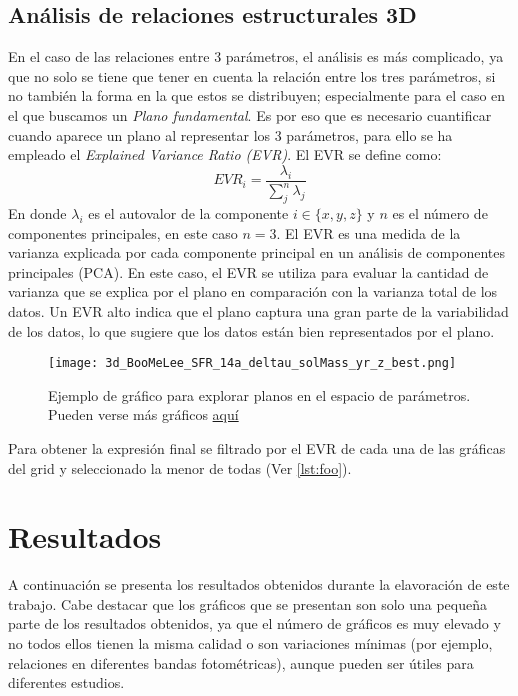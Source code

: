 \documentclass[11pt, a4paper]{article} %
\begin{document}
\subsection{Análisis de relaciones estructurales 3D}

En el caso de las relaciones entre 3 parámetros, el análisis es más complicado, ya que no solo se tiene que tener en cuenta la relación entre los tres parámetros, si no también la forma en la que estos se distribuyen; especialmente para el caso en el que buscamos un \textit{Plano fundamental}. 
Es por eso que es necesario cuantificar cuando aparece un plano al representar los 3 parámetros, para ello se ha empleado el \textit{Explained Variance Ratio (EVR)}. El EVR se define como:
\begin{equation}
    EVR_i=\frac{\lambda_i}{\sum_j^n\lambda_j}
\end{equation}
En donde $\lambda_i$ es el autovalor de la componente $i\in\{x,y,z\}$ y $n$ es el número de componentes principales, en este caso $n=3$.
El EVR es una medida de la varianza explicada por cada componente principal en un análisis de componentes principales (PCA). 
En este caso, el EVR se utiliza para evaluar la cantidad de varianza que se explica por el plano en comparación con la varianza total de los datos. Un EVR alto indica que el plano captura una gran parte de la variabilidad de los datos, lo que sugiere que los datos están bien representados por el plano.

\begin{figure}[H]
    \centering
    \texttt{[image: 3d\_BooMeLee\_SFR\_14a\_deltau\_solMass\_yr\_z\_best.png]}
    \caption{Ejemplo de gráfico para explorar planos en el espacio de parámetros. Pueden verse más gráficos \href{https://github.com/PhyAMR/TFG/tree/main/MSFR}{aquí}}
    \label{fig:3dexample}
\end{figure}

Para obtener la expresión final se filtrado por el EVR de cada una de las gráficas del grid y seleccionado la menor de todas (Ver \ref{lst:foo}).



\section{Resultados}
A continuación se presenta los resultados obtenidos durante la elavoración de este trabajo. Cabe destacar que los gráficos que 
se presentan son solo una pequeña parte de los resultados obtenidos, ya que el número de gráficos es muy elevado y no todos 
ellos tienen la misma calidad o son variaciones mínimas (por ejemplo, relaciones en diferentes bandas fotométricas), aunque pueden ser útiles para diferentes estudios.
\end{document}
